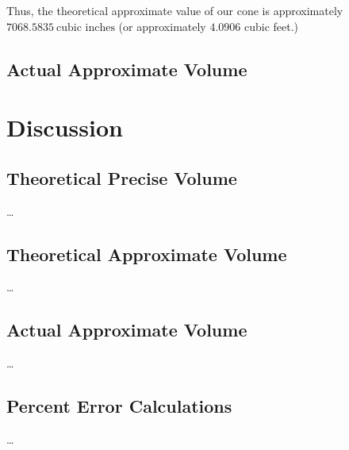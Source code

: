 \documentclass[12pt]{article}
\begin{document}
Thus, the theoretical approximate value of our cone is approximately $\boxed{
7068.5835 \ \text{cubic inches}}$ (or approximately $4.0906$ cubic feet.)

\subsection{Actual Approximate Volume}

\clearpage

\section{Discussion}

\subsection{Theoretical Precise Volume}

…

\subsection{Theoretical Approximate Volume}

…

\subsection{Actual Approximate Volume}

…

\subsection{Percent Error Calculations}

…
\end{document}
